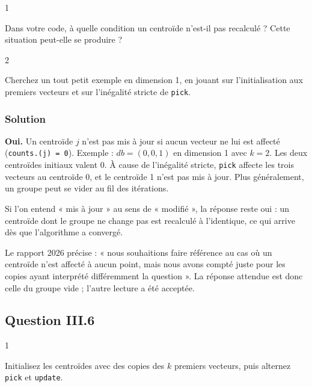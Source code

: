 \documentclass[11pt,a4paper]{article}
\begin{document}
\begin{indication}{1}

Dans votre code, à quelle condition un centroïde n'est-il pas recalculé ? Cette situation peut-elle se produire ?

\end{indication}

\begin{indication}{2}

Cherchez un tout petit exemple en dimension 1, en jouant sur l'initialisation aux premiers vecteurs et sur l'inégalité stricte de \texttt{pick}.

\end{indication}

\hypertarget{solution-21}{%
\subsubsection{Solution}\label{solution-21}}

\textbf{Oui.} Un centroïde \(j\) n'est pas mis à jour si aucun vecteur ne lui est affecté (\texttt{counts.(j)\ =\ 0}). Exemple : \(db=(0,0,1)\) en dimension 1 avec \(k=2\). Les deux centroïdes initiaux valent \(0\). À cause de l'inégalité stricte, \texttt{pick} affecte les trois vecteurs au centroïde 0, et le centroïde 1 n'est pas mis à jour. Plus généralement, un groupe peut se vider au fil des itérations.

Si l'on entend « mis à jour » au sens de « modifié », la réponse reste oui : un centroïde dont le groupe ne change pas est recalculé à l'identique, ce qui arrive dès que l'algorithme a convergé.

\begin{jury}

Le rapport 2026 précise : « nous souhaitions faire référence au cas où un centroïde n'est affecté à aucun point, mais nous avons compté juste pour les copies ayant interprété différemment la question ». La réponse attendue est donc celle du groupe vide ; l'autre lecture a été acceptée.

\end{jury}

\hypertarget{question-iii.6}{%
\subsection{Question III.6}\label{question-iii.6}}

\begin{indication}{1}

Initialisez les centroïdes avec des copies des \(k\) premiers vecteurs, puis alternez \texttt{pick} et \texttt{update}.

\end{indication}
\end{document}
